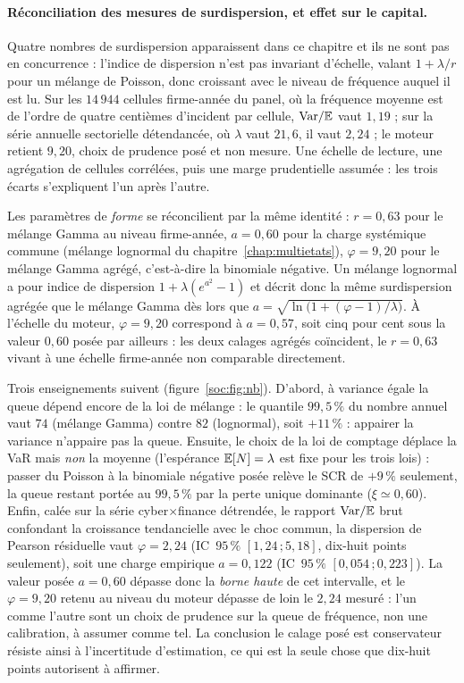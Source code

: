 \paragraph{Réconciliation des mesures de surdispersion, et effet sur le capital.} Quatre nombres
de surdispersion apparaissent dans ce chapitre et ils ne sont pas en concurrence : l'indice de
dispersion n'est pas invariant d'échelle, valant $1+\lambda/r$ pour un mélange de Poisson, donc
croissant avec le niveau de fréquence auquel il est lu. Sur les $14\,944$ cellules firme-année du
panel, où la fréquence moyenne est de l'ordre de quatre centièmes d'incident par cellule,
$\mathrm{Var}/\mathbb{E}$ vaut $1{,}19$ ; sur la série annuelle sectorielle détendancée, où $\lambda$ vaut
$21{,}6$, il vaut $2{,}24$ ; le moteur retient $9{,}20$, choix de prudence posé et non mesure.
Une échelle de lecture, une agrégation de cellules corrélées, puis une marge prudentielle
assumée : les trois écarts s'expliquent l'un après l'autre.

Les paramètres de \emph{forme} se réconcilient par la même identité : $r=0{,}63$ pour le mélange
Gamma au niveau firme-année, $a=0{,}60$ pour la charge systémique commune (mélange lognormal du
chapitre~\ref{chap:multietats}), $\varphi=9{,}20$ pour le mélange Gamma agrégé, c'est-à-dire la
binomiale négative. Un mélange lognormal a pour indice de dispersion $1+\lambda(e^{a^2}-1)$ et
décrit donc la même surdispersion agrégée que le mélange Gamma dès lors que
$a=\sqrt{\ln\!\bigl(1+(\varphi-1)/\lambda\bigr)}$. À l'échelle du moteur, $\varphi=9{,}20$
correspond à $a=0{,}57$, soit cinq pour cent sous la valeur $0{,}60$ posée par ailleurs : les deux
calages agrégés coïncident, le $r=0{,}63$ vivant à une échelle firme-année non comparable
directement.

Trois enseignements suivent (figure~\ref{soc:fig:nb}). D'abord, à variance égale la queue
dépend encore de la loi de mélange : le quantile $99{,}5\,\%$ du nombre annuel vaut $74$
(mélange Gamma) contre $82$ (lognormal), soit $+11\,\%$ : appairer la variance n'appaire pas
la queue. Ensuite, le choix de la loi de comptage déplace la VaR mais \emph{non} la moyenne
(l'espérance $\mathbb{E}[N]=\lambda$ est fixe pour les trois lois) : passer du Poisson à la binomiale
négative posée relève le SCR de $+9\,\%$ seulement, la queue restant portée au $99{,}5\,\%$ par
la perte unique dominante ($\xi\simeq 0{,}60$). Enfin, calée sur la série cyber$\times$finance
détrendée, le rapport $\mathrm{Var}/\mathbb{E}$ brut confondant la croissance tendancielle avec le choc
commun, la dispersion de Pearson résiduelle vaut $\varphi=2{,}24$
(IC~$95\,\%$ $[1{,}24\,;5{,}18]$, dix-huit points seulement), soit une charge empirique
$a=0{,}122$ (IC~$95\,\%$ $[0{,}054\,;0{,}223]$). La valeur posée $a=0{,}60$ dépasse donc la
\emph{borne haute} de cet intervalle, et le $\varphi=9{,}20$ retenu au niveau du moteur
dépasse de loin le $2{,}24$ mesuré : l'un comme l'autre sont un choix de prudence sur
la queue de fréquence, non une calibration, à assumer comme tel. La conclusion
\og{}le calage posé est conservateur\fg{} résiste ainsi à l'incertitude d'estimation, ce qui
est la seule chose que dix-huit points autorisent à affirmer.

